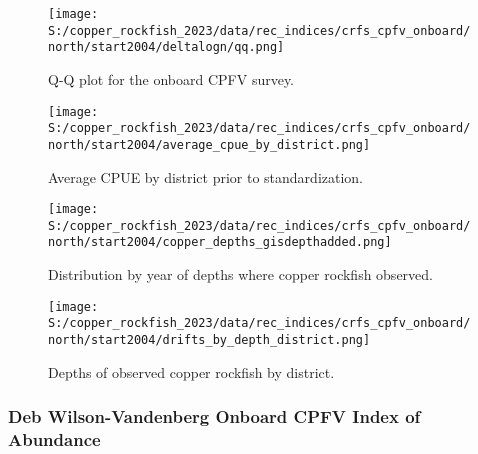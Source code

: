 \documentclass[11pt,
  letterpaper,
]{article}
\begin{document}
\newpage

\begin{figure}
{\centering
\texttt{[image: S:/copper\_rockfish\_2023/data/rec\_indices/crfs\_cpfv\_onboard/north/start2004/deltalogn/qq.png]}
}
\caption{Q-Q plot for the onboard CPFV survey.\label{fig:onboard-qq}}
\end{figure}

\newpage

\begin{figure}
{\centering
\texttt{[image: S:/copper\_rockfish\_2023/data/rec\_indices/crfs\_cpfv\_onboard/north/start2004/average\_cpue\_by\_district.png]}
}
\caption{Average CPUE by district prior to standardization.\label{fig:onboard-regioncpue}}
\end{figure}

\newpage

\begin{figure}
{\centering
\texttt{[image: S:/copper\_rockfish\_2023/data/rec\_indices/crfs\_cpfv\_onboard/north/start2004/copper\_depths\_gisdepthadded.png]}
}
\caption{Distribution by year of depths where copper rockfish observed.\label{fig:onboard-depths}}
\end{figure}

\newpage

\begin{figure}
{\centering
\texttt{[image: S:/copper\_rockfish\_2023/data/rec\_indices/crfs\_cpfv\_onboard/north/start2004/drifts\_by\_depth\_district.png]}
}
\caption{Depths of observed copper rockfish by district.\label{fig:onboard-depths2}}
\end{figure}

\newpage

\subsubsection{Deb Wilson-Vandenberg Onboard CPFV Index of Abundance}\label{dwv-cpfv-index}
\end{document}
